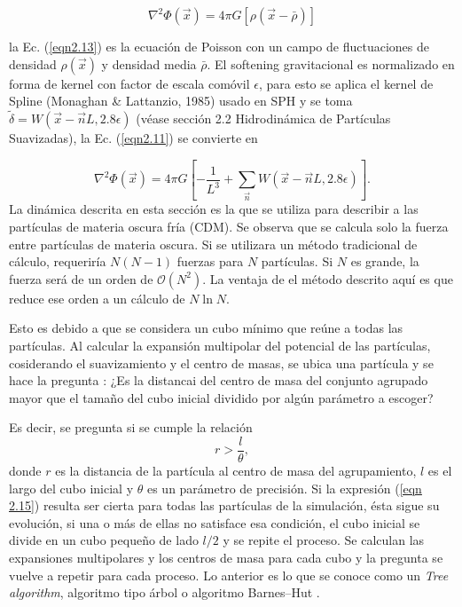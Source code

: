 \documentclass[a4paper,openright,12pt]{book}
\begin{document}
\begin{equation}
  \nabla^{2}\Phi(\vec{x})
  =
  4 \pi G
  [\rho(\vec{x}-\bar{\rho})]\label{eqn2.13}
\end{equation}

la Ec. (\ref{eqn2.13}) es la ecuación de Poisson con un campo de fluctuaciones de densidad $\rho(\vec{x})$ y densidad media $\bar{\rho}$.
El softening gravitacional es normalizado en forma de kernel con factor de escala comóvil $\epsilon$, para esto se aplica el kernel de Spline (Monaghan \& Lattanzio, 1985) \cite{b8.1} usado en SPH y se toma $\tilde{\delta} = W(\vec{x}-\vec{n}L,2.8\epsilon)$ (véase sección 2.2 Hidrodinámica de Partículas Suavizadas), la Ec. (\ref{eqn2.11}) se convierte en

\begin{equation}
 \nabla^{2}\Phi(\vec{x})
 =
 4\pi G
 \left[
 -\frac{1}{L^{3}}
 +
 \sum_{\vec{n}}W(\vec{x}-\vec{n}L,2.8\epsilon)
 \right].
\end{equation}\label{eqn2.14}
La dinámica descrita en esta sección es la que se utiliza para describir a las partículas de materia oscura fría (CDM). Se observa que se calcula solo la fuerza entre partículas de materia oscura. Si se utilizara un método tradicional de cálculo,  requeriría $N(N-1)$ fuerzas para $N$ partículas. Si $N$ es grande, la fuerza será de un orden de $\mathcal{O}(N^{2})$. La ventaja de el método descrito aquí es que reduce ese orden a un cálculo de $N \ln N$. 

Esto es debido a que se considera un cubo mínimo que reúne a todas las partículas. Al calcular la expansión multipolar del potencial de las partículas, cosiderando el suavizamiento y el centro de masas, se ubica una partícula y se hace la pregunta : ¿Es la distancai del centro de masa del conjunto agrupado mayor que el tamaño del cubo inicial dividido por algún parámetro a escoger?

Es decir, se pregunta si se cumple la relación 
\begin{equation}
r > \frac{l}{\theta}, \label{eqn 2.15}
\end{equation}
donde $r$ es la distancia de la partícula al centro de masa del agrupamiento, $l$ es el largo del cubo inicial y $\theta$ es un parámetro de precisión. Si la expresión (\ref{eqn 2.15}) resulta ser cierta para todas las partículas de la simulación, ésta sigue su evolución, si una o más de ellas no satisface esa condición, el cubo inicial se divide en un cubo pequeño de lado $l/2$ y se repite el proceso. Se calculan las expansiones multipolares y los centros de masa para cada cubo y la pregunta se vuelve a repetir para cada proceso. Lo anterior es lo que se conoce como un \textit{Tree algorithm}, algoritmo tipo árbol o algoritmo Barnes--Hut \cite{b8.2}.
 
\end{document}
